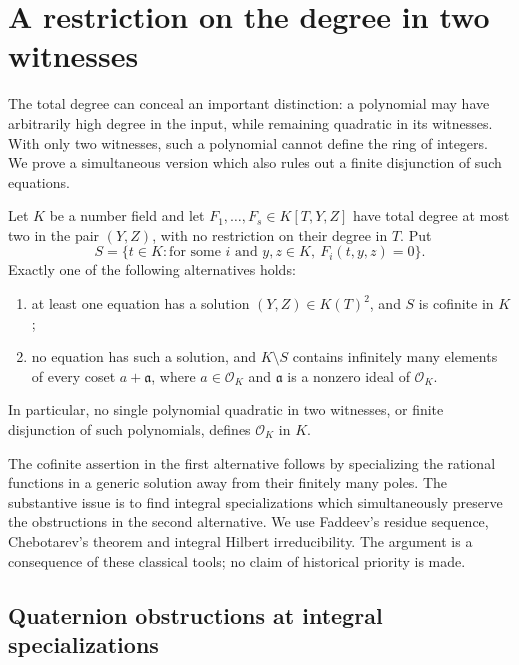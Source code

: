 \section{A restriction on the degree in two witnesses}
\label{sec:p2lb-conics}

The total degree can conceal an important distinction: a polynomial may
have arbitrarily high degree in the input, while remaining quadratic in
its witnesses.  With only two witnesses, such a polynomial cannot define
the ring of integers.  We prove a simultaneous version which also rules
out a finite disjunction of such equations.

\begin{theorem}\label{p2lb:quadratic-witnesses}
Let $K$ be a number field and let
$F_1,\ldots,F_s\in K[T,Y,Z]$ have total degree at most two in the
pair $(Y,Z)$, with no restriction on their degree in $T$.  Put
\[
 S=\{t\in K:\text{for some }i\text{ and }y,z\in K,
                         \ F_i(t,y,z)=0\}.
\]
Exactly one of the following alternatives holds:
\begin{enumerate}
\item at least one equation has a solution
$(Y,Z)\in K(T)^2$, and $S$ is cofinite in $K$;
\item no equation has such a solution, and $K\setminus S$ contains
infinitely many elements of every coset $a+\mathfrak a$, where
$a\in\mathcal O_K$ and $\mathfrak a$ is a nonzero ideal of
$\mathcal O_K$.
\end{enumerate}
In particular, no single polynomial quadratic in two witnesses, or
finite disjunction of such polynomials, defines $\mathcal O_K$ in $K$.
\end{theorem}

The cofinite assertion in the first alternative follows by specializing
the rational functions in a generic solution away from their finitely
many poles.  The substantive issue is to find integral specializations
which simultaneously preserve the obstructions in the second alternative.
We use Faddeev's residue sequence, Chebotarev's theorem and integral
Hilbert irreducibility.  The argument is a consequence of these classical
tools; no claim of historical priority is made.

\subsection{Quaternion obstructions at integral specializations}

